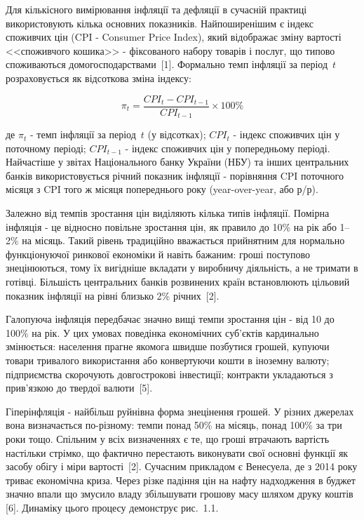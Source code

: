 \documentclass[a4paper,ukrainian,oneside]{extreport}
\begin{document}
Для кількісного вимірювання інфляції та дефляції в сучасній практиці використовують кілька основних показників. Найпоширенішим є індекс споживчих цін (CPI - Consumer Price Index), який відображає зміну вартості <<споживчого кошика>> - фіксованого набору товарів і послуг, що типово споживаються домогосподарствами~[1]. Формально темп інфляції за період~$t$ розраховується як відсоткова зміна індексу:

\begin{equation}
\pi_t = \frac{CPI_t - CPI_{t-1}}{CPI_{t-1}} \times 100\%
\end{equation}

де $\pi_t$ - темп інфляції за період~$t$ (у відсотках); $CPI_t$ - індекс споживчих цін у поточному періоді; $CPI_{t-1}$ - індекс споживчих цін у попередньому періоді. Найчастіше у звітах Національного банку України (НБУ) та інших центральних банків використовується річний показник інфляції - порівняння CPI поточного місяця з CPI того ж місяця попереднього року (year-over-year, або р/р).

Залежно від темпів зростання цін виділяють кілька типів інфляції. Помірна інфляція - це відносно повільне зростання цін, як правило до 10\% на рік або 1--2\% на місяць. Такий рівень традиційно вважається прийнятним для нормально функціонуючої ринкової економіки й навіть бажаним: гроші поступово знецінюються, тому їх вигідніше вкладати у виробничу діяльність, а не тримати в готівці. Більшість центральних банків розвинених країн встановлюють цільовий показник інфляції на рівні близько 2\% річних~[2].

Галопуюча інфляція передбачає значно вищі темпи зростання цін - від 10 до 100\% на рік. У цих умовах поведінка економічних суб'єктів кардинально змінюється: населення прагне якомога швидше позбутися грошей, купуючи товари тривалого використання або конвертуючи кошти в іноземну валюту; підприємства скорочують довгострокові інвестиції; контракти укладаються з прив'язкою до твердої валюти~[5].

Гіперінфляція - найбільш руйнівна форма знецінення грошей. У різних джерелах вона визначається по-різному: темпи понад 50\% на місяць, понад 100\% за три роки тощо. Спільним у всіх визначеннях є те, що гроші втрачають вартість настільки стрімко, що фактично перестають виконувати свої основні функції як засобу обігу і міри вартості~[2]. Сучасним прикладом є Венесуела, де з 2014 року триває економічна криза. Через різке падіння цін на нафту надходження в буджет значно впали що змусило владу збільшувати грошову масу шляхом друку коштів [6]. Динаміку цього процесу демонструє рис.~1.1.
\end{document}
